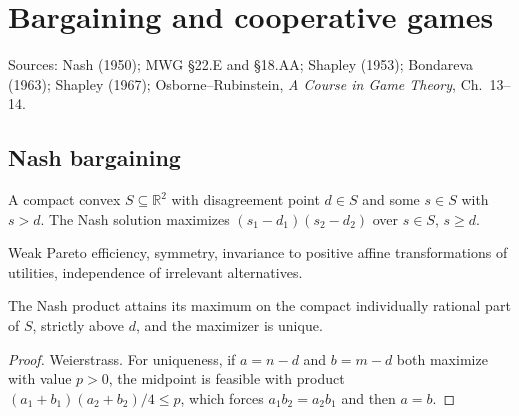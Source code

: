 \chapter{Bargaining and cooperative games}
\label{chap:cooperative}

Sources: Nash (1950); MWG §22.E and §18.AA; Shapley (1953); Bondareva (1963); Shapley (1967);
Osborne--Rubinstein, \emph{A Course in Game Theory}, Ch.~13--14.

\section{Nash bargaining}

\begin{definition}
\label{def:bargaining}
\leanok
A compact convex $S \subseteq \mathbb{R}^2$ with disagreement point $d \in S$ and some $s \in S$ with $s > d$. The
Nash solution maximizes $(s_1 - d_1)(s_2 - d_2)$ over $s \in S$, $s \ge d$.
\end{definition}

\begin{definition}
\label{def:nash-axioms}
\leanok
{}
Weak Pareto efficiency, symmetry, invariance to positive affine transformations of utilities, independence of
irrelevant alternatives.
\end{definition}

\begin{lemma}
\label{lem:nash-solution}
\leanok
{}
The Nash product attains its maximum on the compact individually rational part of $S$, strictly above $d$, and the
maximizer is unique.
\end{lemma}
\begin{proof}
\leanok
Weierstrass. For uniqueness, if $a = n - d$ and $b = m - d$ both maximize with value $p > 0$, the midpoint is
feasible with product $(a_1+b_1)(a_2+b_2)/4 \le p$, which forces $a_1 b_2 = a_2 b_1$ and then $a = b$.
\end{proof}

